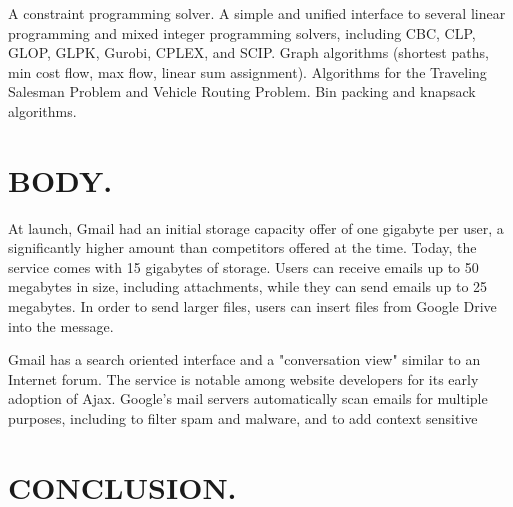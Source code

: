 \documentclass[10pt,letterpaper]{article}
\begin{document}
A constraint programming solver.
A simple and unified interface to several linear programming and mixed integer programming solvers, including CBC, CLP, GLOP, GLPK, Gurobi, CPLEX, and SCIP.
Graph algorithms (shortest paths, min cost flow, max flow, linear sum assignment).
Algorithms for the Traveling Salesman Problem and Vehicle Routing Problem.
Bin packing and knapsack algorithms.

\section{BODY.}
At launch, Gmail had an initial storage capacity offer of
one gigabyte per user, a significantly higher amount than
competitors offered at the time. Today, the service comes with
15 gigabytes of storage. Users can receive emails up to
50 megabytes in size, including attachments, while they can
send emails up to 25 megabytes. In order to send larger files,
users can insert files from Google Drive into the message.

Gmail has a search oriented
interface and a "conversation
view" similar to an Internet forum. The service is notable
among website developers for its early adoption of Ajax.
Google's mail servers automatically scan emails for multiple
purposes, including to filter spam and malware, and to add
context sensitive

\section{CONCLUSION.}



\end{document}
